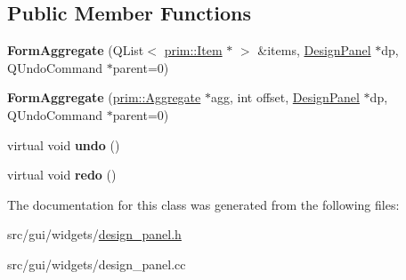 \subsection*{Public Member Functions}
\begin{DoxyCompactItemize}
\item 
{\bfseries Form\+Aggregate} (Q\+List$<$ \hyperlink{classprim_1_1Item}{prim\+::\+Item} $\ast$ $>$ \&items, \hyperlink{classgui_1_1DesignPanel}{Design\+Panel} $\ast$dp, Q\+Undo\+Command $\ast$parent=0)\hypertarget{classgui_1_1DesignPanel_1_1FormAggregate_a62abcd9d0c89992639623cf076639771}{}\label{classgui_1_1DesignPanel_1_1FormAggregate_a62abcd9d0c89992639623cf076639771}

\item 
{\bfseries Form\+Aggregate} (\hyperlink{classprim_1_1Aggregate}{prim\+::\+Aggregate} $\ast$agg, int offset, \hyperlink{classgui_1_1DesignPanel}{Design\+Panel} $\ast$dp, Q\+Undo\+Command $\ast$parent=0)\hypertarget{classgui_1_1DesignPanel_1_1FormAggregate_a191472adbd2388b6c5ebadcbda122a07}{}\label{classgui_1_1DesignPanel_1_1FormAggregate_a191472adbd2388b6c5ebadcbda122a07}

\item 
virtual void {\bfseries undo} ()\hypertarget{classgui_1_1DesignPanel_1_1FormAggregate_abe4938b2bbcb5a963d20142b643df287}{}\label{classgui_1_1DesignPanel_1_1FormAggregate_abe4938b2bbcb5a963d20142b643df287}

\item 
virtual void {\bfseries redo} ()\hypertarget{classgui_1_1DesignPanel_1_1FormAggregate_a399210ee2d517994871d6d5f91fcf364}{}\label{classgui_1_1DesignPanel_1_1FormAggregate_a399210ee2d517994871d6d5f91fcf364}

\end{DoxyCompactItemize}


The documentation for this class was generated from the following files\+:\begin{DoxyCompactItemize}
\item 
src/gui/widgets/\hyperlink{design__panel_8h}{design\+\_\+panel.\+h}\item 
src/gui/widgets/design\+\_\+panel.\+cc\end{DoxyCompactItemize}
